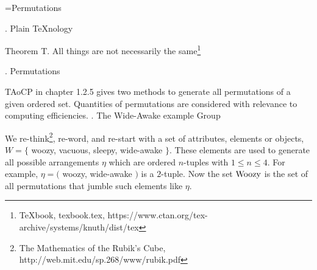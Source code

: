 
\def\a{\left(\matrix }
\def\b{\cr}
\def\c{\right)}

\def\d{\footnote*{The Mathematics of the Rubik’s Cube,
  http://web.mit.edu/sp.268/www/rubik.pdf}}
\def\f{\footnote*{TAoCP chapter 1.2.5,
  https://www-cs-faculty.stanford.edu/\%7Eknuth/taocp.html}}
\def\g{\footnote*{\TeX book, texbook.tex,
  https://www.ctan.org/tex-archive/systems/knuth/dist/tex}}
\def\gg{\footnote*{https://books.google.co.uk/books?id=\%5fn1vr0\%5fRbXoC\&lpg=PA786\&pg=PA786}}
%
\def\dd{\footnote*{https://github.com/the-number/R/blob/explore/0001/gnubik/explore/a/p/6/in-pictures.org}}
\def\e{\bigskip}
\def\R{\hbox{Woozy}}
\def\*{\circ}
%
\vsize=300pt %
\hsize=480pt %

\footline={\tenrm Permutations\quad\dotfill\quad \folio}
\raggedright

. Plain \TeX nology %

\proclaim Theorem T. All things are not necessarily the same\g

\def\strutdepth{\dp\strutbox}
\def\marginalstar{\strut\vadjust{\kern-\strutdepth\specialstar}}
\def\specialstar{\vtop to \strutdepth{
  \baselineskip\strutdepth
  \vss\llap{* }\null}}

. Permutations

\e
TAoCP in chapter 1.2.5 gives two methods to generate
all permutations of a given ordered set.
Quantities of permutations are considered
with relevance to computing efficiencies.
. The Wide-Awake example Group

\e
We re-think\d, re-word, and re-start
with a set of attributes, elements or objects,\break
$W=\{$ woozy, vacuous, sleepy, wide-awake $\}.$
These elements are used to generate all possible
arrangements $\eta$ which are ordered $n$-tuples with
$1\le n\le4.$
For example, $\eta=($ woozy, wide-awake $)$ is a $2$-tuple.
Now the set $\R$ is the set of all permutations that jumble
such elements like $\eta.$

